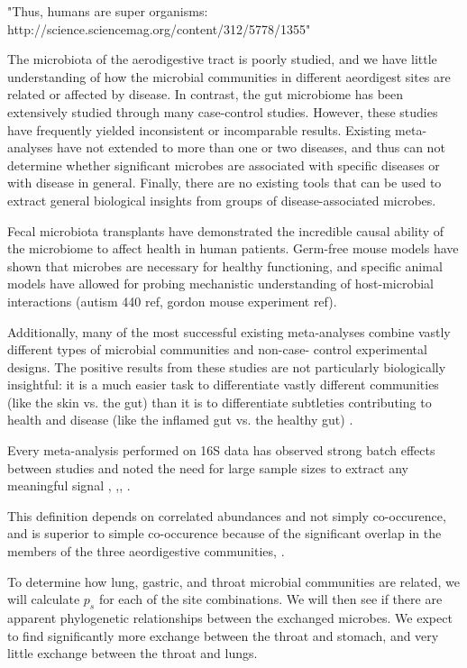 "Thus, humans are super organisms: http://science.sciencemag.org/content/312/5778/1355"

The microbiota of 
the aerodigestive tract is poorly studied, and we have little understanding 
of how the microbial communities in different aeordigest sites are related or 
affected by disease. In contrast, the gut microbiome has 
been extensively studied through many case-control studies. 
However, these studies have frequently yielded inconsistent or incomparable 
results. Existing meta-analyses have not extended to more than one or two 
diseases, and thus can not determine whether significant microbes are 
associated with specific diseases or with disease in general. 
Finally, there are no existing tools that can be used to extract general 
biological insights from groups of disease-associated microbes.

Fecal microbiota transplants have demonstrated the incredible
causal ability of the microbiome to affect health in 
human patients. Germ-free mouse models have shown that microbes are
necessary for healthy functioning, and specific animal models have  
allowed for probing mechanistic understanding of host-microbial 
interactions (autism 440 ref, gordon mouse experiment ref). 

Additionally, many of the most successful existing meta-analyses 
combine vastly different types of microbial communities and non-case-
control experimental designs. The positive results from these studies 
are not particularly biologically insightful: it is a much easier task 
to differentiate vastly different communities (like the skin vs. the 
gut) than it is to differentiate subtleties contributing to health and 
disease (like the inflamed gut vs. the healthy gut) \cite{knights-supervised-2010}.

Every meta-analysis performed on 16S data has observed 
strong batch effects between studies and noted the need for large 
sample sizes to extract any meaningful signal \cite{sze-signal-2016},
\cite{walters-ob_meta-2014},\cite{knights-supervised-2010},
\cite{lozupone-meta-2013}. 

This definition depends on correlated abundances and not simply co-occurence, and is 
superior to simple co-occurence because of the significant overlap in the
members of the three aeordigestive communities\cite{bassis-source-2015}, \cite{charslon-topographical-2011}.

To determine how lung, gastric, and throat microbial communities are related,
we will calculate $p_s$ for each of the site combinations. We will 
then see if there are apparent phylogenetic relationships between
the exchanged microbes. We expect to find significantly more exchange
between the throat and stomach, and very little exchange between the throat and lungs. 




